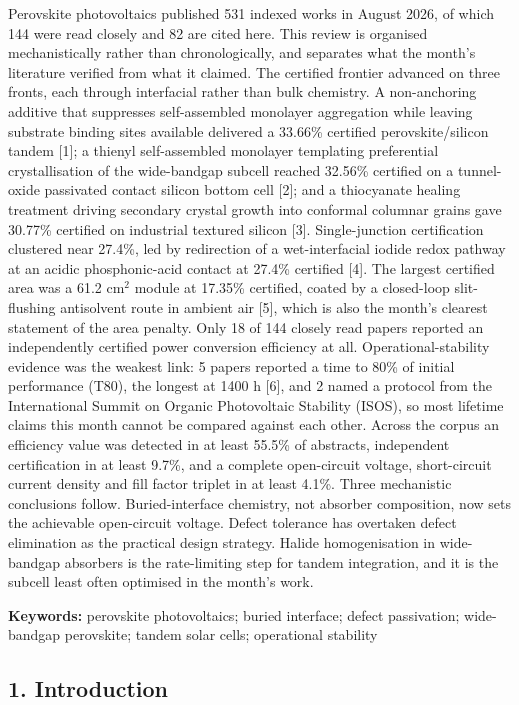 \documentclass[
  11pt,
]{article}
\begin{document}
Perovskite photovoltaics published 531 indexed works in August 2026, of
which 144 were read closely and 82 are cited here. This review is
organised mechanistically rather than chronologically, and separates
what the month's literature verified from what it claimed. The certified
frontier advanced on three fronts, each through interfacial rather than
bulk chemistry. A non-anchoring additive that suppresses self-assembled
monolayer aggregation while leaving substrate binding sites available
delivered a 33.66\% certified perovskite/silicon tandem {[}1{]}; a
thienyl self-assembled monolayer templating preferential crystallisation
of the wide-bandgap subcell reached 32.56\% certified on a tunnel-oxide
passivated contact silicon bottom cell {[}2{]}; and a thiocyanate
healing treatment driving secondary crystal growth into conformal
columnar grains gave 30.77\% certified on industrial textured silicon
{[}3{]}. Single-junction certification clustered near 27.4\%, led by
redirection of a wet-interfacial iodide redox pathway at an acidic
phosphonic-acid contact at 27.4\% certified {[}4{]}. The largest
certified area was a 61.2 cm\(^2\) module at 17.35\% certified, coated
by a closed-loop slit-flushing antisolvent route in ambient air {[}5{]},
which is also the month's clearest statement of the area penalty. Only
18 of 144 closely read papers reported an independently certified power
conversion efficiency at all. Operational-stability evidence was the
weakest link: 5 papers reported a time to 80\% of initial performance
(T80), the longest at 1400 h {[}6{]}, and 2 named a protocol from the
International Summit on Organic Photovoltaic Stability (ISOS), so most
lifetime claims this month cannot be compared against each other. Across
the corpus an efficiency value was detected in at least 55.5\% of
abstracts, independent certification in at least 9.7\%, and a complete
open-circuit voltage, short-circuit current density and fill factor
triplet in at least 4.1\%. Three mechanistic conclusions follow.
Buried-interface chemistry, not absorber composition, now sets the
achievable open-circuit voltage. Defect tolerance has overtaken defect
elimination as the practical design strategy. Halide homogenisation in
wide-bandgap absorbers is the rate-limiting step for tandem integration,
and it is the subcell least often optimised in the month's work.

\textbf{Keywords:} perovskite photovoltaics; buried interface; defect
passivation; wide-bandgap perovskite; tandem solar cells; operational
stability

\subsection{1. Introduction}\label{introduction}
\end{document}
